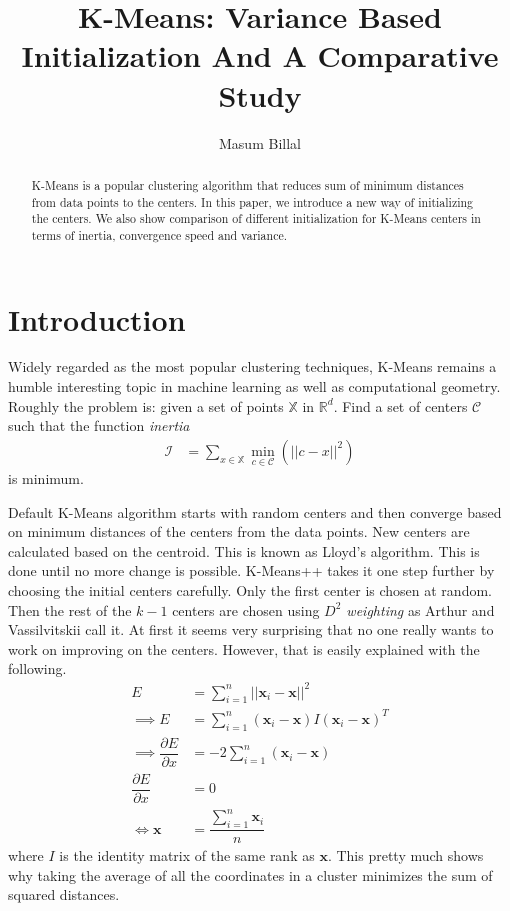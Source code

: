 \documentclass[10pt, leqno]{article}
\author{Masum Billal}
\title{K-Means: Variance Based Initialization And A Comparative Study}
\newcommand{\x}{\mathbf{x}}
\begin{document}
	\maketitle
		\begin{abstract}
			K-Means is a popular clustering algorithm that reduces sum of minimum distances from data points to the centers. In this paper, we introduce a new way of initializing the centers. We also show comparison of different initialization for K-Means centers in terms of inertia, convergence speed and variance.
		\end{abstract}
	\section{Introduction}
	Widely regarded as the most popular clustering techniques, K-Means remains a humble interesting topic in machine learning as well as computational geometry. Roughly the problem is: given a set of points $\mathbb{X}$ in $\mathbb{R}^d$. Find a set of centers $\mathcal{C}$ such that the function \textit{inertia}
		\begin{align*}
			\mathcal{I} & = \sum_{x\in\mathbb{X}}\min_{c\in\mathcal{C}}(||c-x||^2)
		\end{align*}
	is minimum.
	
	Default K-Means algorithm starts with random centers and then converge based on minimum distances of the centers from the data points. New centers are calculated based on the centroid. This is known as Lloyd's algorithm\cite{lloyd}. This is done until no more change is possible. K-Means++ takes it one step further by choosing the initial centers carefully. Only the first center is chosen at random. Then the rest of the $k-1$ centers are chosen using \textit{$D^2$ weighting} as Arthur and Vassilvitskii call it\cite{kmeans++}. At first it seems very surprising that no one really wants to work on improving on the centers. However, that is easily explained with the following.
		\begin{align*}
			E & = \sum_{i=1}^n||\x_i-\x||^2\\
			\implies E & = \sum_{i=1}^n(\x_i-\x)I(\x_i-\x)^{T}\\
			\implies \dfrac{\partial{E}}{\partial{x}} & = -2\sum_{i=1}^n(\x_i-\x)\\
			\dfrac{\partial{E}}{\partial{x}} & = 0\\
			\iff \x & = \dfrac{\sum_{i=1}^n\x_i}{n}
		\end{align*}
	where $I$ is the identity matrix of the same rank as $\x$. This pretty much shows why taking the average of all the coordinates in a cluster minimizes the sum of squared distances.
	
\end{document}

